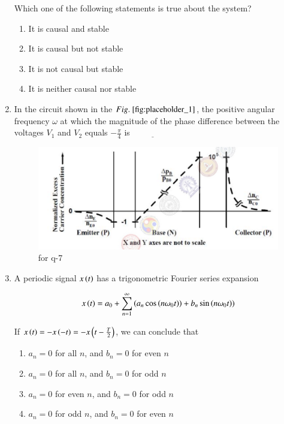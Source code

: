\documentclass[journal,12pt,onecolumn]{IEEEtran}
\theoremstyle{remark}
\begin{document}
\begin{enumerate}
Which one of the following statements is true about the system?  
\begin{multicols}{2}
\begin{enumerate}
\item It is causal and stable
\item It is causal but not stable
\item It is not causal but stable
\item It is neither causal nor stable
\end{enumerate}
\end{multicols}
\hfill {}

\item In the circuit shown in the $\figref{fig:placeholder_1}$, the positive angular frequency $\omega$  at which the magnitude of the phase difference between the voltages $V_1$ and $V_2$ equals $-\frac{\pi}{4}$ is  $\underline{\hspace{2cm}}$
\begin{figure}[H]
    \centering
    \includegraphics[width=0.5\columnwidth]{figs/2.png}
    \caption{\centering for q-7}
    \label{fig:placeholder_1}
\end{figure}

\hfill {}

\item A periodic signal $x\left(t\right)$ has a trigonometric Fourier series expansion  

\begin{align*}
    x\left(t\right) = a_0 + \sum_{n=1}^{\infty} \left( a_n \cos\left(n\omega_0 t\right)\right) + b_n \sin\left(n\omega_0 t\right) )
\end{align*}

If $x\left(t\right) = -x\left(-t\right) = -x\left(t - \frac{T}{2}\right)$, we can conclude that  
\begin{enumerate}
\item $a_n = 0$ for all $n$, and $b_n = 0$ for even $n$
\item $a_n = 0$ for all $n$, and $b_n = 0$ for odd $n$
\item $a_n = 0$ for even $n$, and $b_n = 0$ for odd $n$
\item $a_n = 0$ for odd $n$, and $b_n = 0$ for even $n$
\end{enumerate}
\hfill {}


\end{enumerate}
\end{document}
